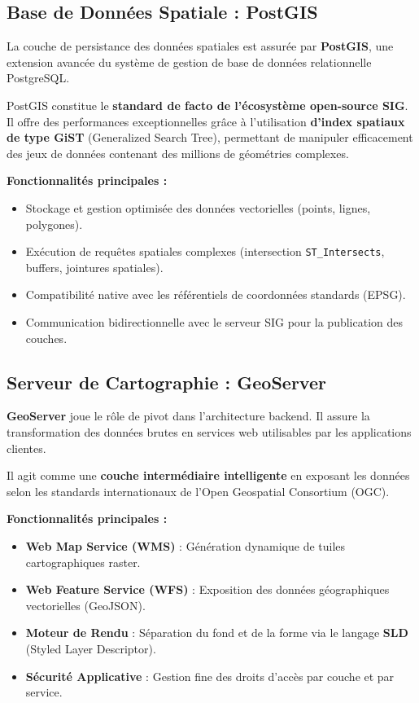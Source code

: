 \documentclass[11pt,a4paper]{article}
\begin{document}
\subsection{Base de Données Spatiale : PostGIS}
La couche de persistance des données spatiales est assurée par \textbf{PostGIS}, une extension avancée du système de gestion de base de données relationnelle PostgreSQL.

PostGIS constitue le \textbf{standard de facto de l’écosystème open-source SIG}. Il offre des performances exceptionnelles grâce à l’utilisation \textbf{d’index spatiaux de type GiST} (Generalized Search Tree), permettant de manipuler efficacement des jeux de données contenant des millions de géométries complexes.

\textbf{Fonctionnalités principales :}
\begin{itemize}
    \item Stockage et gestion optimisée des données vectorielles (points, lignes, polygones).
    \item Exécution de requêtes spatiales complexes (intersection \texttt{ST\_Intersects}, buffers, jointures spatiales).
    \item Compatibilité native avec les référentiels de coordonnées standards (EPSG).
    \item Communication bidirectionnelle avec le serveur SIG pour la publication des couches.
\end{itemize}

\subsection{Serveur de Cartographie : GeoServer}
\textbf{GeoServer} joue le rôle de pivot dans l’architecture backend. Il assure la transformation des données brutes en services web utilisables par les applications clientes.

Il agit comme une \textbf{couche intermédiaire intelligente} en exposant les données selon les standards internationaux de l’Open Geospatial Consortium (OGC).

\textbf{Fonctionnalités principales :}
\begin{itemize}
    \item \textbf{Web Map Service (WMS)} : Génération dynamique de tuiles cartographiques raster.
    \item \textbf{Web Feature Service (WFS)} : Exposition des données géographiques vectorielles (GeoJSON).
    \item \textbf{Moteur de Rendu} : Séparation du fond et de la forme via le langage \textbf{SLD} (Styled Layer Descriptor).
    \item \textbf{Sécurité Applicative} : Gestion fine des droits d'accès par couche et par service.
\end{itemize}
\end{document}
